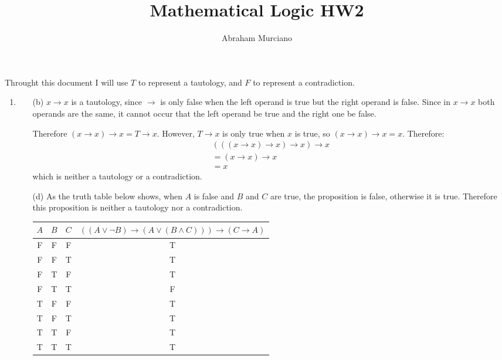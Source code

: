 \documentclass[fleqn]{article}
\title{Mathematical Logic HW2}
\author{Abraham Murciano}
\begin{document}
\maketitle

Throught this document I will use \(T\) to represent a tautology, and \(F\) to represent a contradiction.

\begin{enumerate}
	\item %
	\begin{enumerate}
		\item[(b)]
		\(x \rightarrow x\) is a tautology, since \(\rightarrow\) is only false when the left operand is true but the right operand is false. Since in \(x \rightarrow x\) both operands are the same, it cannot occur that the left operand be true and the right one be false.

		Therefore \((x \rightarrow x) \rightarrow x = T \rightarrow x\). However, \(T \rightarrow x\) is only true when \(x\) is true, so \((x \rightarrow x) \rightarrow x = x\). Therefore:
		\begin{gather*}
			(((x \rightarrow x) \rightarrow x) \rightarrow x) \rightarrow x \\
			= (x \rightarrow x) \rightarrow x \\
			= x
		\end{gather*}
		which is neither a tautology or a contradiction.

		\item[(d)]
		As the truth table below shows, when \(A\) is false and \(B\) and \(C\) are true, the proposition is false, otherwise it is true. Therefore this proposition is neither a tautology nor a contradiction.
		 
		\begin{tabular}{||c|c|c||c||}
			\hline
			\(A\) & \(B\) & \(C\) & \(((A \lor \lnot B) \rightarrow (A \lor (B \land C))) \rightarrow (C \rightarrow A)\) \\
			\hline
			F & F & F & T\\
			F & F & T & T\\
			F & T & F & T\\
			F & T & T & F\\
			T & F & F & T\\
			T & F & T & T\\
			T & T & F & T\\
			T & T & T & T\\
			\hline
		\end{tabular}
	\end{enumerate}


\end{enumerate}
\end{document}
